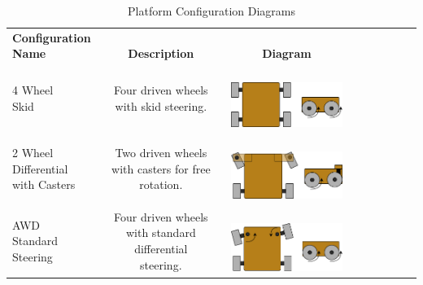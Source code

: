 \documentclass{article}
\begin{document}
     \begin{table}[H]
		
		
		\caption{Platform Configuration Diagrams}
		\label{PlatformConfigDiagramsTable}
		\begin{adjustwidth}{-1in}{-1in}
		\centering
		\setlength{\dashlinedash}{.5pt}
		\setlength\tabcolsep{4pt}
		\def\arraystretch{1.9}
		

		\begin{tabular}{lcccccccc}
		\hline
        \makecell{\textbf{Configuration}\\ \textbf{Name}} & \makecell{\\ \textbf{Description}} & \makecell{\\ \textbf{Diagram}}  \\ 
		\makecell[l]{4 Wheel \\ Skid} &  \makecell[l]{Four driven wheels \\ with skid steering.} &  \makecell[l]{\\ \includegraphics[width=4cm]{4_wheel_skid}} \\  
		\makecell[l]{2 Wheel \\ Differential \\ with Casters} &  \makecell[l]{Two driven wheels \\ with casters for free \\ rotation.} &  \makecell[l]{\\ \includegraphics[width=4cm]{2_wheel_diff}} \\
		\makecell[l]{AWD \\ Standard \\ Steering} &  \makecell[l]{Four driven wheels \\ with standard differential \\ steering.} &  \makecell[l]{\\ \includegraphics[width=4cm]{awd_standard_steer}} \\

\end{tabular}
\end{adjustwidth}
\end{table}
\end{document}
